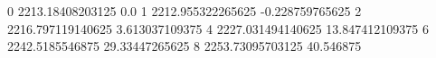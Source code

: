 0 2213.18408203125 0.0
1 2212.955322265625 -0.228759765625
2 2216.797119140625 3.613037109375
4 2227.031494140625 13.847412109375
6 2242.5185546875 29.33447265625
8 2253.73095703125 40.546875
